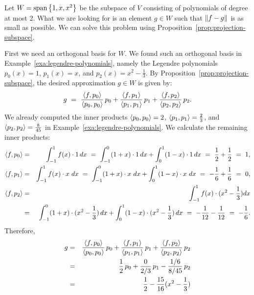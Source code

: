 \begin{solution}
  Let $W=\sspan\set{1,x,x^2}$ be the subspace of $V$ consisting of
  polynomials of degree at most 2. What we are looking for is an
  element $g\in W$ such that $\left\|f-g\right\|$ is as small as possible.  We
  can solve this problem using
  Proposition~\ref{prop:projection-subspace}.

  First we need an orthogonal basis for $W$. We found such an
  orthogonal basis in Example~\ref{exa:legendre-polynomials}, namely
  the Legendre polynomials $p_0(x) = 1$, $p_1(x) = x$, and
  $p_2(x) = x^2-\frac{1}{3}$.  By
  Proposition~\ref{prop:projection-subspace}, the desired
  approximation $g\in W$ is given by:
  \begin{equation*}
    g
    ~=~
    \frac{\langle f,p_0\rangle}{\langle p_0,p_0\rangle}\,p_0
    + \frac{\langle f,p_1\rangle}{\langle p_1,p_1\rangle}\,p_1
    + \frac{\langle f,p_2\rangle}{\langle p_2,p_2\rangle}\,p_2.
  \end{equation*}
  We already computed the inner products $\langle p_0,p_0\rangle=2$,
  $\langle p_1,p_1\rangle=\frac{2}{3}$, and $\langle p_2,p_2\rangle=\frac{8}{45}$ in
  Example~\ref{exa:legendre-polynomials}. We calculate the remaining
  inner products:
  \begin{eqnarray*}
    \langle f,p_0\rangle
    &=& \int_{-1}^{1} f(x)\cdot 1\,dx
        ~=~ \int_{-1}^{0} (1+x)\cdot 1\,dx
        +   \int_{0}^{1} (1-x)\cdot 1\,dx
        ~=~ \frac{1}{2} + \frac{1}{2}
        ~=~ 1, \\
    \langle f,p_1\rangle
    &=& \int_{-1}^{1} f(x)\cdot x\,\,dx
        ~=~ \int_{-1}^{0} (1+x)\cdot x\,\,dx
        +   \int_{0}^{1} (1-x)\cdot x\,\,dx
        ~=~ -\frac{1}{6} + \frac{1}{6}
        ~=~ 0, \\
    \langle f,p_2\rangle
    &=& \int_{-1}^{1} f(x)\cdot (x^2-\frac{1}{3}) dx \\
    &=& \int_{-1}^{0} (1+x)\cdot (x^2-\frac{1}{3})\,dx
        +   \int_{0}^{1} (1-x)\cdot (x^2-\frac{1}{3})\,dx
        ~=~ - \frac{1}{12} - \frac{1}{12}
        ~=~ -\frac{1}{6}. \\
  \end{eqnarray*}
  Therefore,
  \begin{eqnarray*}
    g
    &=&
    \frac{\iprod{f,p_0}}{\iprod{p_0,p_0}}\,p_0
        + \frac{\iprod{f,p_1}}{\iprod{p_1,p_1}}\,p_1
        + \frac{\iprod{f,p_2}}{\iprod{p_2,p_2}}\,p_2
    \\
    &=& \frac{1}{2}\,p_0
        + \frac{0}{2/3}\,p_1
        - \frac{1/6}{8/45}\,p_2
    \\
    &=& \frac{1}{2}
        - \frac{15}{16}(x^2-\frac{1}{3})

\end{eqnarray*}
\end{solution}
